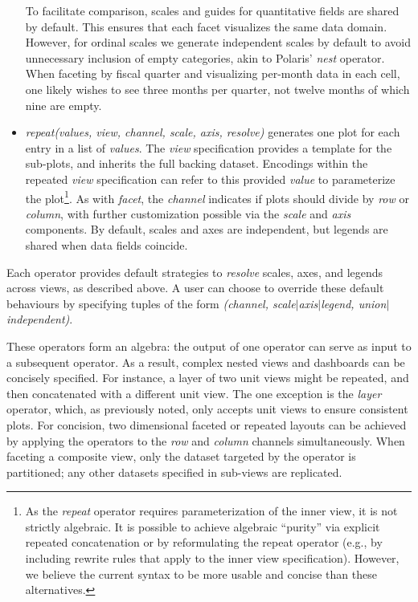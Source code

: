 \begin{itemize}
    To facilitate comparison, scales and guides for quantitative fields are shared
  by default. This ensures that each facet visualizes the same data domain.
  However, for ordinal scales we generate independent scales by default to avoid
  unnecessary inclusion of empty categories, akin to Polaris' \emph{nest}
  operator. When faceting by fiscal quarter and visualizing per-month data in each
  cell, one likely wishes to see three months per quarter, not twelve months of
  which nine are empty.

  \item \emph{repeat(values, view, channel, scale, axis, resolve)} generates
  one plot for each entry in a list of \emph{values}. The \emph{view}
  specification provides a template for the sub-plots, and inherits the full
  backing dataset. Encodings within the repeated \emph{view} specification can
  refer to this provided \emph{value} to parameterize the plot\footnote{As the
  \emph{repeat} operator requires parameterization of the inner view, it is not
  strictly algebraic. It is possible to achieve algebraic ``purity'' via
  explicit repeated concatenation or by reformulating the repeat operator (e.g.,
  by including rewrite rules that apply to the inner view specification).
  However, we believe the current syntax to be more usable and concise than
  these alternatives.}. As with \emph{facet}, the \emph{channel} indicates if
  plots should divide by \emph{row} or \emph{column}, with further customization
  possible via the \emph{scale} and \emph{axis} components. By default, scales
  and axes are independent, but legends are shared when data fields coincide.
\end{itemize}

Each operator provides default strategies to \emph{resolve} scales, axes, and
legends across views, as described above. A user can choose to override these
default behaviours by specifying tuples of the form \emph{(channel,
scale$|$axis$|$legend, union$|$independent)}.

These operators form an algebra: the output of one operator can serve as input
to a subsequent operator. As a result, complex nested views and dashboards can
be concisely specified. For instance, a layer of two unit views might be
repeated, and then concatenated with a different unit view. The one exception is
the \emph{layer} operator, which, as previously noted, only accepts unit views
to ensure consistent plots. For concision, two dimensional faceted or repeated
layouts can be achieved by applying the operators to the \emph{row} and
\emph{column} channels simultaneously. When faceting a composite view, only the
dataset targeted by the operator is partitioned; any other datasets specified in
sub-views are replicated.